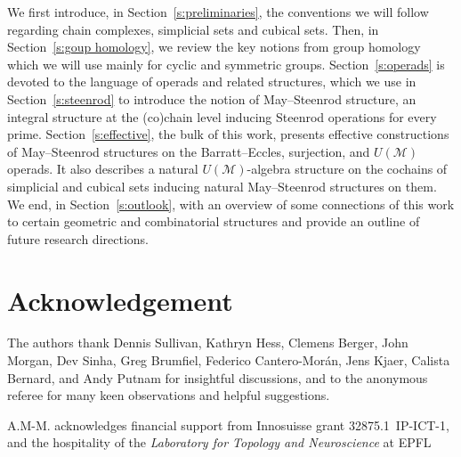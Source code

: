 We first introduce, in Section~\ref{s:preliminaries}, the conventions we will follow regarding chain complexes, simplicial sets and cubical sets.
Then, in Section~\ref{s:goup homology}, we review the key notions from group homology which we will use mainly for cyclic and symmetric groups.
Section~\ref{s:operads} is devoted to the language of operads and related structures, which we use in Section~\ref{s:steenrod} to introduce the notion of May--Steenrod structure, an integral structure at the (co)chain level inducing Steenrod operations for every prime.
Section~\ref{s:effective}, the bulk of this work, presents effective constructions of May--Steenrod structures on the Barratt--Eccles, surjection, and $U(\mathcal M)$ operads.
It also describes a natural $U(\mathcal M)$-algebra structure on the cochains of simplicial and cubical sets inducing natural May--Steenrod structures on them.
We end, in Section~\ref{s:outlook}, with an overview of some connections of this work to certain geometric and combinatorial structures and provide an outline of future research directions.

\section*{Acknowledgement}

The authors thank Dennis Sullivan, Kathryn Hess, Clemens Berger, John Morgan, Dev Sinha, Greg Brumfiel, Federico Cantero-Mor\'an, Jens Kjaer, Calista Bernard, and Andy Putnam for insightful discussions, and to the anonymous referee for many keen observations and helpful suggestions.

A.M-M. acknowledges financial support from Innosuisse grant \mbox{32875.1 IP-ICT-1}, and the hospitality of the \textit{Laboratory for Topology and Neuroscience} at EPFL